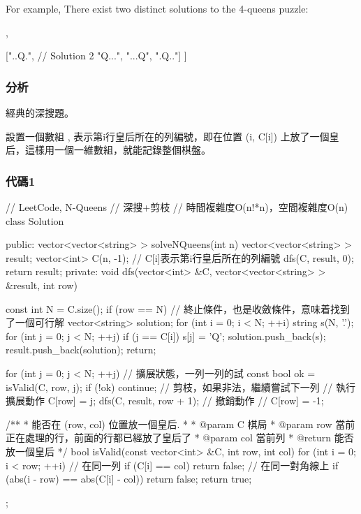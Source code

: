 For example,
There exist two distinct solutions to the 4-queens puzzle:
\begin{Code}
[
 [".Q..",  // Solution 1
  "...Q",
  "Q...",
  "..Q."],

 ["..Q.",  // Solution 2
  "Q...",
  "...Q",
  ".Q.."]
]
\end{Code}


\subsubsection{分析}

經典的深搜題。

設置一個數組 ,  表示第i行皇后所在的列編號，即在位置 (i, C[i]) 上放了一個皇后，這樣用一個一維數組，就能記錄整個棋盤。


\subsubsection{代碼1}
\begin{Code}
// LeetCode, N-Queens
// 深搜+剪枝
// 時間複雜度O(n!*n)，空間複雜度O(n)
class Solution {
public:
    vector<vector<string> > solveNQueens(int n) {
        vector<vector<string> > result;
        vector<int> C(n, -1);  // C[i]表示第i行皇后所在的列編號
        dfs(C, result, 0);
        return result;
    }
private:
    void dfs(vector<int> &C, vector<vector<string> > &result, int row) {
        const int N = C.size();
        if (row == N) { // 終止條件，也是收斂條件，意味着找到了一個可行解
            vector<string> solution;
            for (int i = 0; i < N; ++i) {
                string s(N, '.');
                for (int j = 0; j < N; ++j) {
                    if (j == C[i]) s[j] = 'Q';
                }
                solution.push_back(s);
            }
            result.push_back(solution);
            return;
        }

        for (int j = 0; j < N; ++j) {  // 擴展狀態，一列一列的試
            const bool ok = isValid(C, row, j);
            if (!ok) continue;  // 剪枝，如果非法，繼續嘗試下一列
            // 執行擴展動作
            C[row] = j;
            dfs(C, result, row + 1);
            // 撤銷動作
            // C[row] = -1;
        }
    }
    
    /**
     * 能否在 (row, col) 位置放一個皇后.
     *
     * @param C 棋局
     * @param row 當前正在處理的行，前面的行都已經放了皇后了
     * @param col 當前列
     * @return 能否放一個皇后
     */
    bool isValid(const vector<int> &C, int row, int col) {
        for (int i = 0; i < row; ++i) {
            // 在同一列
            if (C[i] == col) return false;
            // 在同一對角線上
            if (abs(i - row) == abs(C[i] - col)) return false;
        }
        return true;
    }
};
\end{Code}


